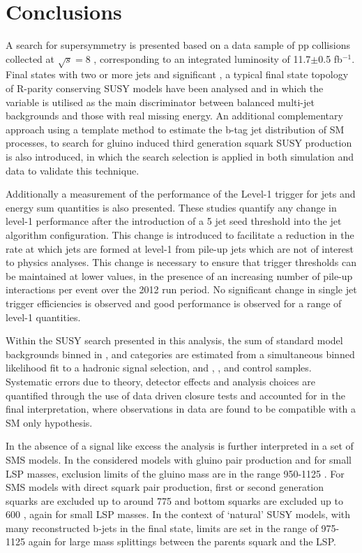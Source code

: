 \chapter{Conclusions}
\label{chap:conclusions}

A search for supersymmetry is presented based on a data sample of pp collisions collected at $\sqrt{s} = 8$ \TeV, corresponding to an integrated luminosity of 11.7$\pm$0.5 fb$^{-1}$. 
Final states with two or more jets and significant \met, a typical final state topology of R-parity conserving \ac{SUSY} models have been analysed and in which the \alphat variable is utilised as the main discriminator between balanced multi-jet backgrounds and those with real missing energy. An additional complementary approach using a template method to estimate the b-tag jet distribution of \ac{SM} processes, to search for gluino induced third generation squark \ac{SUSY} production is also introduced, in which the \alphat search selection is applied in both simulation and data to validate this technique.

 Additionally a measurement of the performance of the Level-1 trigger for jets and energy sum quantities is also presented. These studies quantify any change in level-1 performance after the introduction of a 5 \GeV jet seed threshold into the jet algorithm configuration. This change is introduced to facilitate a reduction in the rate at which jets are formed at level-1 from pile-up jets which are not of interest to physics analyses. This change is necessary to ensure that trigger thresholds can be maintained at lower values, in the presence of an increasing number of pile-up interactions per event over the 2012 run period. No significant change in single jet trigger efficiencies is observed and good performance is observed for a range of level-1 quantities.

Within the \ac{SUSY} search presented in this analysis, the sum of standard model backgrounds binned in \theht, \nbreco and \njet categories are estimated from a simultaneous binned likelihood fit to a hadronic signal selection, and \mupjets, \dimupjets, and \gpjets control samples. Systematic errors due to theory, detector effects and analysis choices are quantified through the use of data driven closure tests and accounted for in the final interpretation,  where observations in data are found to be compatible with a \ac{SM} only hypothesis. 

In the absence of a signal like excess the analysis is further interpreted in a set of \ac{SMS} models. In the considered models with gluino pair production and for small \ac{LSP} masses, exclusion limits of the gluino mass are in the range 950-1125 \GeV. For \ac{SMS} models with direct squark pair production, first or second generation squarks are excluded up to around 775 \GeV and bottom squarks are excluded up to 600 \GeV, again for small \ac{LSP} masses. In the context of `natural' \ac{SUSY} models, with many reconstructed b-jets in the final state, limits are set in the range of 975-1125 \GeV again for large mass splittings between the parents squark and the \ac{LSP}. 

